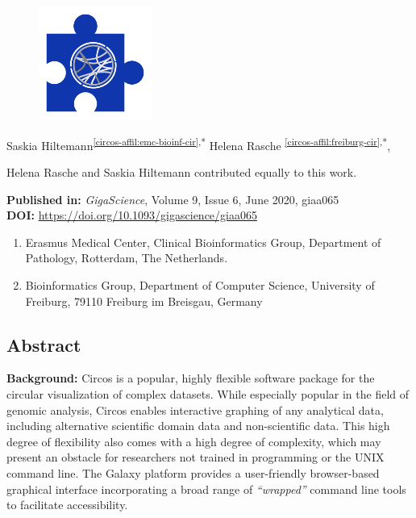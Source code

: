 \cleartorightpage
\setcounter{NAT@ctr}{-1}
\chapter*{}\label{chapter:circos}

\begin{figure}[t!]
\centering
\includegraphics[height=10em]{frontmatter/images/chapter-header-circos.png}
\end{figure}
\vspace{-4cm}



Saskia Hiltemann\textsuperscript{\ref{circos-affil:emc-bioinf-cir},*}
Helena Rasche \textsuperscript{\ref{circos-affil:freiburg-cir},*},

{\color{chaptergrey}{*}} Helena Rasche and Saskia Hiltemann contributed equally to this work.

\textbf{Published in:} \emph{GigaScience}, Volume 9, Issue 6, June 2020, giaa065 \\
\textbf{DOI:} \url{https://doi.org/10.1093/gigascience/giaa065}

\small
\begin{enumerate}
 \itemsep-0.5em
 \item Erasmus Medical Center, Clinical Bioinformatics Group, Department of Pathology, Rotterdam, The Netherlands.\label{circos-affil:emc-bioinf-cir}
 \item Bioinformatics Group, Department of Computer Science, University of Freiburg, 79110 Freiburg im Breisgau, Germany\label{circos-affil:freiburg-cir}
\end{enumerate}



\section*{Abstract}

\textbf{Background:}
Circos is a popular, highly flexible software package for the circular visualization of complex datasets. While especially popular in the field of genomic analysis, Circos enables interactive graphing of any analytical data, including alternative scientific domain data and non-scientific data. This high degree of flexibility also comes with a high degree of complexity, which may present an obstacle for researchers not trained in programming or the UNIX command line. The Galaxy platform provides a user-friendly browser-based graphical interface incorporating a broad range of \emph{“wrapped”} command line tools to facilitate accessibility.



